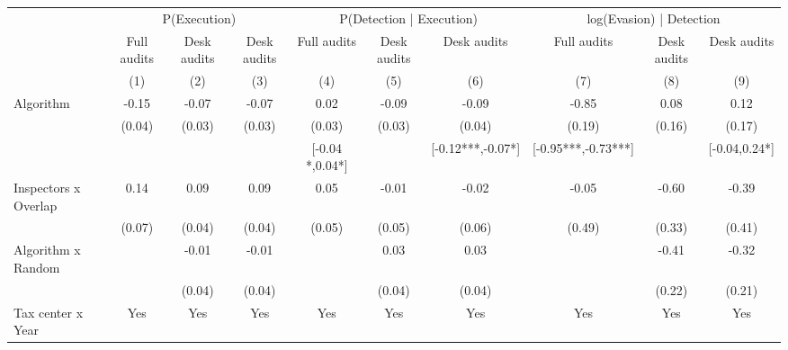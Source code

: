 \begin{tabular}{lccc|ccc|ccc} \toprule
\multicolumn{1}{l}{} & \multicolumn{3}{c}{P(Execution)} & \multicolumn{3}{c}{P(Detection | Execution)} & \multicolumn{3}{c}{log(Evasion) | Detection} \\\cmidrule(lr){2-4}\cmidrule(lr){5-7}\cmidrule(lr){8-10} \multicolumn{1}{l}{} & Full audits & Desk audits & Desk audits & Full audits & Desk audits & Desk audits & Full audits & Desk audits & Desk audits \\ \multicolumn{1}{l}{} & (1) & (2) & (3) & (4) & (5) & (6) & (7) & (8) & (9) \\ \midrule
Algorithm   &       -0.15\sym{***}&       -0.07\sym{**} &       -0.07\sym{**} &        0.02         &       -0.09\sym{**} &       -0.09\sym{**} &       -0.85\sym{***}&        0.08         &        0.12         \\
            &      (0.04)         &      (0.03)         &      (0.03)         &      (0.03)         &      (0.03)         &      (0.04)         &      (0.19)         &      (0.16)         &      (0.17)         \\
\addlinespace
 & & & & [-0.04 *,0.04*] & & [-0.12***,-0.07*] & [-0.95***,-0.73***] & & [-0.04,0.24*] \\  Inspectors x Overlap&        0.14\sym{*}  &        0.09\sym{**} &        0.09\sym{**} &        0.05         &       -0.01         &       -0.02         &       -0.05         &       -0.60\sym{*}  &       -0.39         \\
            &      (0.07)         &      (0.04)         &      (0.04)         &      (0.05)         &      (0.05)         &      (0.06)         &      (0.49)         &      (0.33)         &      (0.41)         \\
\addlinespace
Algorithm x Random&                     &       -0.01         &       -0.01         &                     &        0.03         &        0.03         &                     &       -0.41\sym{*}  &       -0.32         \\
            &                     &      (0.04)         &      (0.04)         &                     &      (0.04)         &      (0.04)         &                     &      (0.22)         &      (0.21)         \\
\midrule
Tax center x Year&         Yes         &         Yes         &         Yes         &         Yes         &         Yes         &         Yes         &         Yes         &         Yes         &         Yes         \\

\end{tabular}
